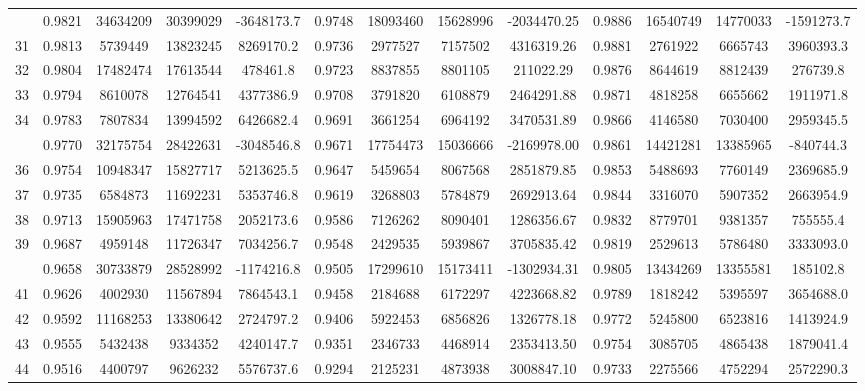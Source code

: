 \documentclass[
  12pt,
]{article}
\begin{document}
\begin{longtable}[t]{lcccccccccccc}
\addlinespace
30 & 0.9821 & 34634209 & 30399029 & -3648173.7 & 0.9748 & 18093460 & 15628996 & -2034470.25 & 0.9886 & 16540749 & 14770033 & -1591273.7\\
31 & 0.9813 & 5739449 & 13823245 & 8269170.2 & 0.9736 & 2977527 & 7157502 & 4316319.26 & 0.9881 & 2761922 & 6665743 & 3960393.3\\
32 & 0.9804 & 17482474 & 17613544 & 478461.8 & 0.9723 & 8837855 & 8801105 & 211022.29 & 0.9876 & 8644619 & 8812439 & 276739.8\\
33 & 0.9794 & 8610078 & 12764541 & 4377386.9 & 0.9708 & 3791820 & 6108879 & 2464291.88 & 0.9871 & 4818258 & 6655662 & 1911971.8\\
34 & 0.9783 & 7807834 & 13994592 & 6426682.4 & 0.9691 & 3661254 & 6964192 & 3470531.89 & 0.9866 & 4146580 & 7030400 & 2959345.5\\
\addlinespace
35 & 0.9770 & 32175754 & 28422631 & -3048546.8 & 0.9671 & 17754473 & 15036666 & -2169978.00 & 0.9861 & 14421281 & 13385965 & -840744.3\\
36 & 0.9754 & 10948347 & 15827717 & 5213625.5 & 0.9647 & 5459654 & 8067568 & 2851879.85 & 0.9853 & 5488693 & 7760149 & 2369685.9\\
37 & 0.9735 & 6584873 & 11692231 & 5353746.8 & 0.9619 & 3268803 & 5784879 & 2692913.64 & 0.9844 & 3316070 & 5907352 & 2663954.9\\
38 & 0.9713 & 15905963 & 17471758 & 2052173.6 & 0.9586 & 7126262 & 8090401 & 1286356.67 & 0.9832 & 8779701 & 9381357 & 755555.4\\
39 & 0.9687 & 4959148 & 11726347 & 7034256.7 & 0.9548 & 2429535 & 5939867 & 3705835.42 & 0.9819 & 2529613 & 5786480 & 3333093.0\\
\addlinespace
40 & 0.9658 & 30733879 & 28528992 & -1174216.8 & 0.9505 & 17299610 & 15173411 & -1302934.31 & 0.9805 & 13434269 & 13355581 & 185102.8\\
41 & 0.9626 & 4002930 & 11567894 & 7864543.1 & 0.9458 & 2184688 & 6172297 & 4223668.82 & 0.9789 & 1818242 & 5395597 & 3654688.0\\
42 & 0.9592 & 11168253 & 13380642 & 2724797.2 & 0.9406 & 5922453 & 6856826 & 1326778.18 & 0.9772 & 5245800 & 6523816 & 1413924.9\\
43 & 0.9555 & 5432438 & 9334352 & 4240147.7 & 0.9351 & 2346733 & 4468914 & 2353413.50 & 0.9754 & 3085705 & 4865438 & 1879041.4\\
44 & 0.9516 & 4400797 & 9626232 & 5576737.6 & 0.9294 & 2125231 & 4873938 & 3008847.10 & 0.9733 & 2275566 & 4752294 & 2572290.3\\

\end{longtable}
\end{document}
